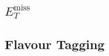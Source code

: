 \subsection{$E_T^{\text{miss}}$}
\label{sec:metsys}

\subsection{Flavour Tagging}
\label{sec:bjetsys}

